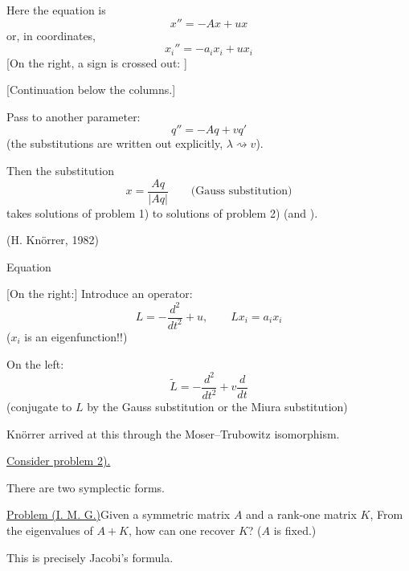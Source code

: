 Here the equation is
\begin{equation*}
x''=-Ax+ux\tag{$1'$}
\end{equation*}
or, in coordinates,
\begin{equation*}
x_i''=-a_i x_i+ux_i\tag{$1''$}
\end{equation*}
[On the right, a sign is crossed out: ]

[Continuation below the columns.]

Pass to another parameter:
\begin{equation*}
q''=-Aq+vq'\tag{2}
\end{equation*}
(the substitutions are written out explicitly, $\lambda\rightsquigarrow v$).


Then the substitution
\begin{equation*}
x=\frac{Aq}{|Aq|}\qquad\text{(Gauss substitution)}\tag{3}
\end{equation*}
takes solutions of problem 1) to solutions of problem 2)
(and ).

(H. Kn\"orrer, 1982)

Equation

[On the right:] Introduce an operator:
\begin{equation*}
L=-\frac{d^2}{dt^2}+u,\qquad Lx_i=a_i x_i\tag{4}
\end{equation*}
($x_i$ is an eigenfunction!!)


On the left:
\begin{equation*}
\widetilde L=-\frac{d^2}{dt^2}+v\frac{d}{dt}\tag{5}
\end{equation*}
(conjugate to $L$ by the Gauss substitution or the Miura substitution)

Kn\"orrer arrived at this through the Moser--Trubowitz isomorphism.

\underline{Consider problem 2).}

There are two symplectic forms.

\underline{Problem (I. M. G.)}\quad Given a symmetric matrix $A$ and a rank-one matrix $K$,
From the eigenvalues of $A+K$, how can one recover $K$? ($A$ is fixed.)

This is precisely Jacobi's formula.

